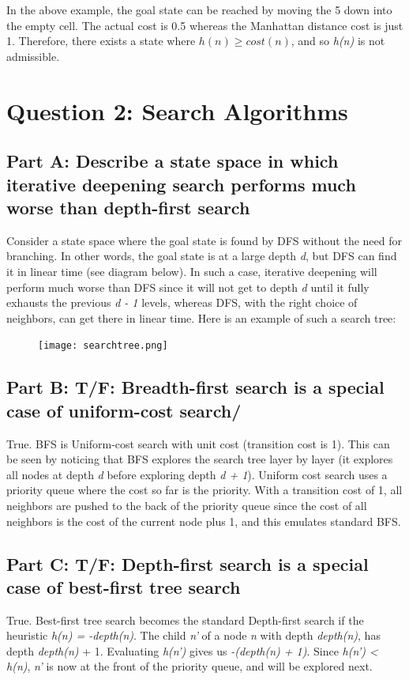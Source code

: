 \documentclass[paper=a4, fontsize=11pt]{scrartcl} %
\numberwithin{equation}{section} %
\numberwithin{figure}{section} %
\numberwithin{table}{section} %
\begin{document}
In the above example, the goal state can be reached by moving the 5 down into the empty cell. The actual cost is 0.5 whereas the Manhattan distance cost is just 1. Therefore, there exists a state where \(h(n) \geq cost(n)\), and so \textit{h(n)} is not admissible.

\section{Question 2: Search Algorithms}
\subsection{Part A: Describe a state space in which iterative deepening search performs much worse than depth-first search}

Consider a state space where the goal state is found by DFS without the need for branching. In other words, the goal state is at a large depth \textit{d}, but DFS can find it in linear time (see diagram below). In such a case, iterative deepening will perform much worse than DFS since it will not get to depth \textit{d} until it fully exhausts the previous \textit{d - 1} levels, whereas DFS, with the right choice of neighbors, can get there in linear time. Here is an example of such a search tree: 
\begin{figure}[H]
    \texttt{[image: searchtree.png]}
\end{figure}

\subsection{Part B: T/F: Breadth-first search is a special case of uniform-cost search/}
True. BFS is Uniform-cost search with unit cost (transition cost is 1). This can be seen by noticing that BFS explores the search tree layer by layer (it explores all nodes at depth \textit{d} before exploring depth \textit{d + 1}). Uniform cost search uses a priority queue where the cost so far is the priority. With a transition cost of 1, all neighbors are pushed to the back of the priority queue since the cost of all neighbors is the cost of the current node plus 1, and this emulates standard BFS.

\subsection{Part C: T/F: Depth-first search is a special case of best-first tree search}
True. Best-first tree search becomes the standard Depth-first search if the heuristic \textit{h(n) = -depth(n)}. The child \textit{n'} of a node \textit{n} with depth \textit{depth(n)}, has depth \textit{depth(n)} + 1. Evaluating \textit{h(n')} gives us \textit{-(depth(n) + 1)}. Since \textit{h(n') < h(n)}, \textit{n'} is now at the front of the priority queue, and will be explored next.
\end{document}

